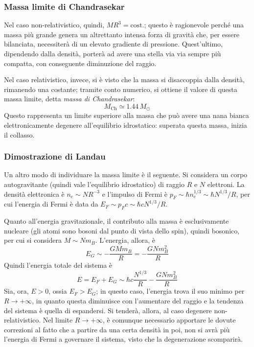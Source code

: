 \documentclass[11pt, a4paper]{scrartcl}
\theoremstyle{style}
\theoremstyle{style1}
\numberwithin{equation}{subsection}
\begin{document}
\subsubsection{Massa limite di Chandrasekar}
Nel caso non-relativistico, quindi, $MR^3 = \text{cost.}$; questo \`e ragionevole perch\'e una massa pi\`u grande genera un altrettanto intensa forza di gravit\`a che, per essere bilanciata, necessiter\`a di un elevato gradiente di pressione.
Quest'ultimo, dipendendo dalla densit\`a, porter\`a ad avere una stella via via sempre pi\`u compatta, con conseguente diminuzione del raggio.

Nel caso relativistico, invece, si \`e visto che la massa si disaccoppia dalla densit\`a, rimanendo una costante; tramite conto numerico, si ottiene il valore di questa massa limite, detta \textit{massa di Chandrasekar}:
\[
M_\text{Ch} \simeq 1.44\, M_\odot 
\] 
Questo rappresenta un limite superiore alla massa che pu\`o avere una nana bianca elettronicamente degenere all'equilibrio idrostatico: superata questa massa, inizia il collasso.


\subsubsection{Dimostrazione di Landau}
Un altro modo di individuare la massa limite \`e il seguente.
Si considera un corpo autogravitante (quindi vale l'equilibrio idrostatico) di raggio $R$ e $N$ elettroni. 
La densit\`a elettronica \`e $n_e \sim NR^{-3}$ e l'impulso di Fermi \`e $p_F \sim \hbar  n_e ^{1/3} \sim \hbar  N^{1 / 3} / R$, per cui l'energia di Fermi \`e data da $E_F \sim p_F c \sim \hbar c N^{1 / 3} / R$.

Quanto all'energia gravitazionale, il contributo alla massa \`e esclusivamente nucleare (gli atomi sono bosoni dal punto di vista dello spin), quindi bosonico, per cui si considera $M \sim N m_B$.
L'energia, allora, \`e
\[
	E_G \sim -\frac{GM m_B }{R} = -\frac{G N m _B^2}{R}
\] 
Quindi l'energia totale del sistema \`e
\[
E = E_F + E_G \sim \hbar  c \frac{N^{1 / 3}}{R} - \frac{G N m_B^2}{R}
\] 
Sia, ora, $E>0$, ossia $E_F > E_G$; in questo caso, l'energia trova il suo minimo per $R\to +\infty$, in quanto questa diminuisce con l'aumentare del raggio e la tendenza del sistema \`e quella di espandersi. 
Si tender\`a, allora, al caso degenere non-relativistico.
Nel limite $R\to +\infty$, \`e comunque necessario apportare le dovute correzioni al fatto che a partire da una certa densit\`a in poi, non si avr\`a pi\`u l'energia di Fermi a governare il sistema, visto che la degenerazione scomparir\`a.
\end{document}
